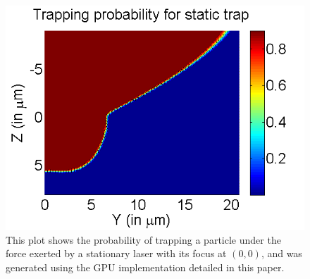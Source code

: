 \begin{figure}[htb!]
\includegraphics[width=\columnwidth]{figures/gpu_static_trap_prob_1024_particles}
\caption{This plot shows the probability of trapping a particle under
  the force exerted by a stationary laser with its focus at $(0,0)$,
  and was generated using the GPU implementation detailed in this paper.}
\label{fig:trapping-prob-static-gpu}
\end{figure}


